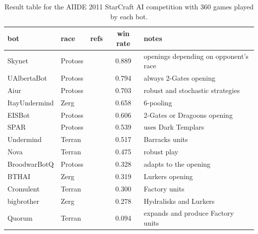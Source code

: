 \begin{table}[h]
    \begin{center}
    \begin{scriptsize}
    \begin{tabular}{|l|l|l|c|l|}
        \hline
        bot & race & refs & win rate & notes \\
        \hline
     Skynet%
& Protoss & & 0.889 & openings depending on opponent's race \\
UAlbertaBot & Protoss & \citep{Churchill2011} & 0.794 & always 2-Gates opening \\
       Aiur%
& Protoss & & 0.703 & robust and stochastic strategies \\
ItayUndermind & Zerg & & 0.658 & 6-pooling \\
       EISBot%
& Protoss & \citep{WeberCIG10,Weber2010cr} & 0.606 & 2-Gates or Dragoons opening \\
         SPAR%
& Protoss & \citep{Kabanza2010} & 0.539 & uses Dark Templars \\
    Undermind & Terran & & 0.517 & Barracks units \\
         Nova%
& Terran & \citep{NovaBot2011} &  0.475 & robust play \\
 BroodwarBotQ%
& Protoss  & %
& 0.328 & adapts to the opening \\
        BTHAI%
& Zerg & \citep{Hagelback2009} & 0.319 & Lurkers opening  \\
    Cromulent & Terran & & 0.300 & Factory units \\
   bigbrother & Zerg & & 0.278 & Hydralisks and Lurkers \\
       Quorum & Terran & & 0.094 & expands and produce Factory units \\
        \hline
    \end{tabular}
    \end{scriptsize}
    \end{center}
    \caption{Result table for the AIIDE 2011 StarCraft AI competition with 360 games played by each bot.}
    \label{tab:botsAIIDE}
\end{table}

